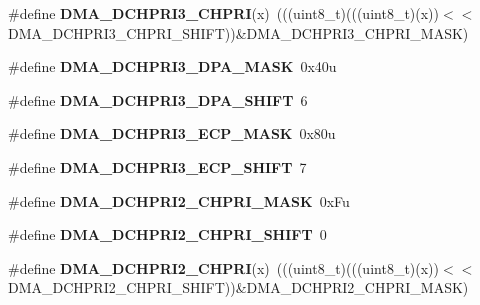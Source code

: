 \begin{DoxyCompactItemize}
\item 
\#define {\bfseries D\+M\+A\+\_\+\+D\+C\+H\+P\+R\+I3\+\_\+\+C\+H\+P\+RI}(x)~(((uint8\+\_\+t)(((uint8\+\_\+t)(x))$<$$<$D\+M\+A\+\_\+\+D\+C\+H\+P\+R\+I3\+\_\+\+C\+H\+P\+R\+I\+\_\+\+S\+H\+I\+FT))\&D\+M\+A\+\_\+\+D\+C\+H\+P\+R\+I3\+\_\+\+C\+H\+P\+R\+I\+\_\+\+M\+A\+SK)\hypertarget{group__DMA__Register__Masks_gabac1032f1fad2a3a27d92490812c6eb3}{}\label{group__DMA__Register__Masks_gabac1032f1fad2a3a27d92490812c6eb3}

\item 
\#define {\bfseries D\+M\+A\+\_\+\+D\+C\+H\+P\+R\+I3\+\_\+\+D\+P\+A\+\_\+\+M\+A\+SK}~0x40u\hypertarget{group__DMA__Register__Masks_gaef70570689d5f3d820526668a189e615}{}\label{group__DMA__Register__Masks_gaef70570689d5f3d820526668a189e615}

\item 
\#define {\bfseries D\+M\+A\+\_\+\+D\+C\+H\+P\+R\+I3\+\_\+\+D\+P\+A\+\_\+\+S\+H\+I\+FT}~6\hypertarget{group__DMA__Register__Masks_ga3efa0a806b45176edb7f736daf5ee774}{}\label{group__DMA__Register__Masks_ga3efa0a806b45176edb7f736daf5ee774}

\item 
\#define {\bfseries D\+M\+A\+\_\+\+D\+C\+H\+P\+R\+I3\+\_\+\+E\+C\+P\+\_\+\+M\+A\+SK}~0x80u\hypertarget{group__DMA__Register__Masks_gabb8c04abc8cce4060af92862f34ed168}{}\label{group__DMA__Register__Masks_gabb8c04abc8cce4060af92862f34ed168}

\item 
\#define {\bfseries D\+M\+A\+\_\+\+D\+C\+H\+P\+R\+I3\+\_\+\+E\+C\+P\+\_\+\+S\+H\+I\+FT}~7\hypertarget{group__DMA__Register__Masks_ga35828808080f8f51927f8731cf8be7bd}{}\label{group__DMA__Register__Masks_ga35828808080f8f51927f8731cf8be7bd}

\item 
\#define {\bfseries D\+M\+A\+\_\+\+D\+C\+H\+P\+R\+I2\+\_\+\+C\+H\+P\+R\+I\+\_\+\+M\+A\+SK}~0x\+Fu\hypertarget{group__DMA__Register__Masks_gaa13f7f19a25ff7ec4c566803d9ab48b8}{}\label{group__DMA__Register__Masks_gaa13f7f19a25ff7ec4c566803d9ab48b8}

\item 
\#define {\bfseries D\+M\+A\+\_\+\+D\+C\+H\+P\+R\+I2\+\_\+\+C\+H\+P\+R\+I\+\_\+\+S\+H\+I\+FT}~0\hypertarget{group__DMA__Register__Masks_gaf8e134ae4fb5fe5af8e99f78b9e7d958}{}\label{group__DMA__Register__Masks_gaf8e134ae4fb5fe5af8e99f78b9e7d958}

\item 
\#define {\bfseries D\+M\+A\+\_\+\+D\+C\+H\+P\+R\+I2\+\_\+\+C\+H\+P\+RI}(x)~(((uint8\+\_\+t)(((uint8\+\_\+t)(x))$<$$<$D\+M\+A\+\_\+\+D\+C\+H\+P\+R\+I2\+\_\+\+C\+H\+P\+R\+I\+\_\+\+S\+H\+I\+FT))\&D\+M\+A\+\_\+\+D\+C\+H\+P\+R\+I2\+\_\+\+C\+H\+P\+R\+I\+\_\+\+M\+A\+SK)\hypertarget{group__DMA__Register__Masks_gadbc9d1829aeacdc6f53ebc706cbff015}{}\label{group__DMA__Register__Masks_gadbc9d1829aeacdc6f53ebc706cbff015}


\end{DoxyCompactItemize}
